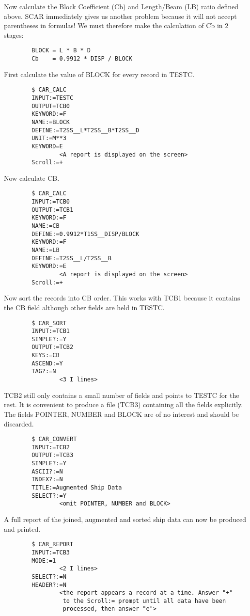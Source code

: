 Now calculate the Block Coefficient (Cb) and Length/Beam (LB) ratio defined
above.
SCAR immediately gives us another problem because it will not accept parentheses
in formulas!
We must therefore make the calculation of Cb in 2 stages:
\begin{verbatim}
        BLOCK = L * B * D
        Cb    = 0.9912 * DISP / BLOCK
\end{verbatim}
First calculate the value of BLOCK for every record in TESTC.
\begin{verbatim}
        $ CAR_CALC
        INPUT:=TESTC
        OUTPUT=TCB0
        KEYWORD:=F
        NAME:=BLOCK
        DEFINE:=T2SS__L*T2SS__B*T2SS__D
        UNIT:=M**3
        KEYWORD=E
                <A report is displayed on the screen>
        Scroll:=+
\end{verbatim}
Now calculate CB.
\begin{verbatim}
        $ CAR_CALC
        INPUT:=TCB0
        OUTPUT:=TCB1
        KEYWORD:=F
        NAME:=CB
        DEFINE:=0.9912*T1SS__DISP/BLOCK
        KEYWORD:=F
        NAME:=LB
        DEFINE:=T2SS__L/T2SS__B
        KEYWORD:=E
                <A report is displayed on the screen>
        Scroll:=+
\end{verbatim}
Now sort the records into CB order.
This works with TCB1 because it contains the CB field although other fields are
held in TESTC.
\begin{verbatim}
        $ CAR_SORT
        INPUT:=TCB1
        SIMPLE?:=Y
        OUTPUT:=TCB2
        KEYS:=CB
        ASCEND:=Y
        TAG?:=N
                <3 I lines>
\end{verbatim}
TCB2 still only contains a small number of fields and points to TESTC for the
rest.
It is convenient to produce a file (TCB3) containing all the fields explicitly.
The fields POINTER, NUMBER and BLOCK are of no interest and should be discarded.
\begin{verbatim}
        $ CAR_CONVERT
        INPUT:=TCB2
        OUTPUT:=TCB3
        SIMPLE?:=Y
        ASCII?:=N
        INDEX?:=N
        TITLE:=Augmented Ship Data
        SELECT?:=Y
                <omit POINTER, NUMBER and BLOCK>
\end{verbatim}
A full report of the joined, augmented and sorted ship data can now be
produced and printed.
\begin{verbatim}
        $ CAR_REPORT
        INPUT:=TCB3
        MODE:=1
                <2 I lines>
        SELECT?:=N
        HEADER?:=N
                <the report appears a record at a time. Answer "+"
                 to the Scroll:= prompt until all data have been
                 processed, then answer "e">
\end{verbatim}
